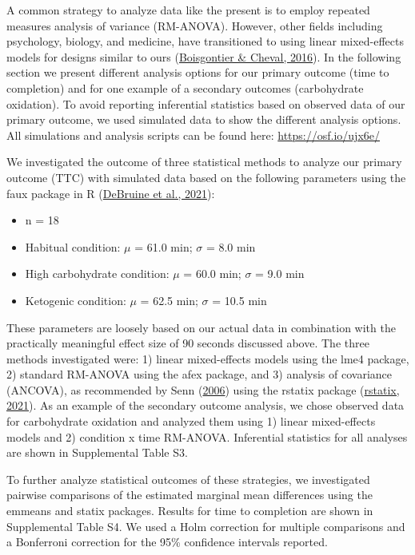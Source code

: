 \documentclass[]{cik}%
\begin{document}
A common strategy to analyze data like the present is to employ repeated
measures analysis of variance (RM-ANOVA). However, other fields
including psychology, biology, and medicine, have transitioned to using
linear mixed-effects models for designs similar to ours
(\protect\hyperlink{ref-62}{Boisgontier \& Cheval, 2016}). In the
following section we present different analysis options for our primary
outcome (time to completion) and for one example of a secondary outcomes
(carbohydrate oxidation). To avoid reporting inferential statistics
based on observed data of our primary outcome, we used simulated data to
show the different analysis options. All simulations and analysis
scripts can be found here: \url{https://osf.io/ujx6e/}

We investigated the outcome of three statistical methods to analyze our
primary outcome (TTC) with simulated data based on the following
parameters using the faux package in R
(\protect\hyperlink{ref-63}{DeBruine et al., 2021}):

\begin{itemize}
\tightlist
\item
  n = 18
\item
  Habitual condition: \(\mu\) = 61.0 min; \(\sigma\) = 8.0 min
\item
  High carbohydrate condition: \(\mu\) = 60.0 min; \(\sigma\) = 9.0 min
\item
  Ketogenic condition: \(\mu\) = 62.5 min; \(\sigma\) = 10.5 min
\end{itemize}

These parameters are loosely based on our actual data in combination
with the practically meaningful effect size of 90 seconds discussed
above. The three methods investigated were: 1) linear mixed-effects
models using the lme4 package, 2) standard RM-ANOVA using the afex
package, and 3) analysis of covariance (ANCOVA), as recommended by Senn
(\protect\hyperlink{ref-64}{2006}) using the rstatix package
(\protect\hyperlink{ref-65}{rstatix, 2021}). As an example of the
secondary outcome analysis, we chose observed data for carbohydrate
oxidation and analyzed them using 1) linear mixed-effects models and 2)
condition x time RM-ANOVA. Inferential statistics for all analyses are
shown in Supplemental Table S3.

To further analyze statistical outcomes of these strategies, we
investigated pairwise comparisons of the estimated marginal mean
differences using the emmeans and statix packages. Results for time to
completion are shown in Supplemental Table S4. We used a Holm correction
for multiple comparisons and a Bonferroni correction for the 95\%
confidence intervals reported.
\end{document}
